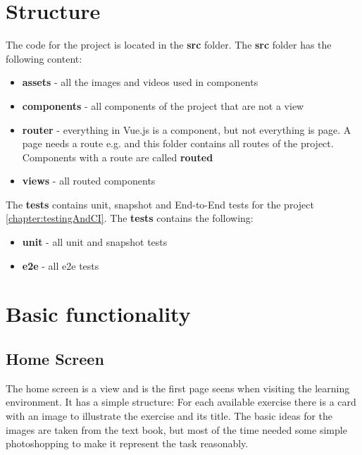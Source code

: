 \section{Structure}
\label{section:structure}
The code for the project is located in the \textbf{src} folder. The \textbf{src} folder has the following content: 

\begin{itemize}
    \item \textbf{assets} - all the images and videos used in components
    \item \textbf{components} - all components of the project that are not a view
    \item \textbf{router} - everything in Vue.js is a component, but not everything is page. A page needs a route e.g.  and this folder contains all routes of the project. Components with a route are called \textbf{routed}
    \item \textbf{views} - all routed components
\end{itemize}

The \textbf{tests} contains unit, snapshot and End-to-End tests for the project \ref{chapter:testingAndCI}. The \textbf{tests} contains the following:

\begin{itemize}
    \item \textbf{unit} - all unit and snapshot tests
    \item \textbf{e2e} - all e2e tests
\end{itemize}

\section{Basic functionality}
\label{section:basicFunctionality}

\subsection{Home Screen}
The home screen is a view and is the first page seens when visiting the learning environment. It has a simple structure: For each available exercise there is a card with an image to illustrate the exercise and its title. The basic ideas for the images are taken from the text book, but most of the time needed some simple photoshopping to make it represent the task reasonably.

